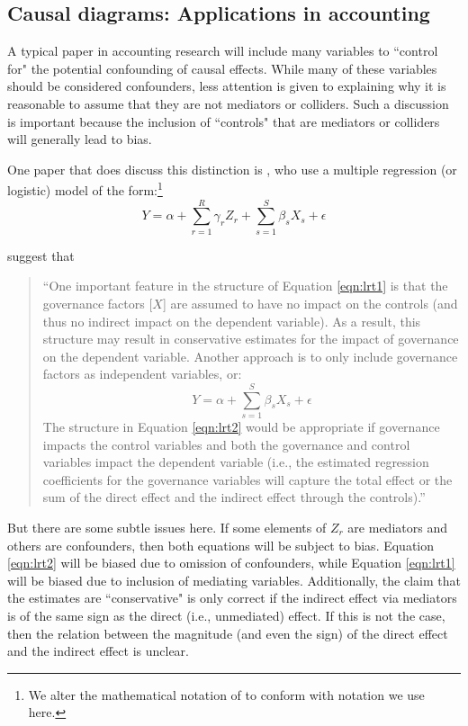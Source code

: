 \documentclass[12pt,reqno,titlepage]{amsart}
\theoremstyle{definition}
\begin{document}
\begin{doublespace}
\subsection{Causal diagrams: Applications in accounting}
A typical paper in accounting research will include many variables  to ``control for" the potential confounding of causal effects.
While many of these variables should be considered confounders, less attention is given to explaining why it is reasonable to assume that they are not mediators or colliders.
Such a discussion is important because the inclusion of ``controls" that are mediators or colliders will generally lead to bias.

One paper that does discuss this distinction is \citet{Larcker:2007aa}, who use a multiple regression (or logistic) model of the form:\footnote{We alter the mathematical notation of  \citet{Larcker:2007aa} to conform with notation we use here.}
\begin{equation}
Y = \alpha + \sum_{r=1}^R \gamma _r Z_r + \sum_{s=1}^S \beta_s X_s + \epsilon \label{eqn:lrt1}
\end{equation}

\noindent \citet{Larcker:2007aa} suggest that 

\begin{quote}\begin{singlespace} 
``One important feature in the structure of Equation \ref{eqn:lrt1} is that the governance factors [$X$] are assumed to have no impact on the controls (and thus no indirect impact on the dependent variable). 
As a result, this structure may result in conservative estimates for the impact of governance on the dependent variable. Another approach is to only include governance factors as independent variables, or:
\begin{equation}
Y = \alpha + \sum_{s =1}^S \beta_s X_s + \epsilon \label{eqn:lrt2}
\end{equation}
The structure in Equation \ref{eqn:lrt2} would be appropriate if governance impacts the control variables and both the governance and control variables impact the dependent variable (i.e., the estimated regression coefficients for the governance variables will capture the total effect or the sum of the direct effect and the indirect effect through the controls).''
\end{singlespace} \end{quote}

But there are some subtle issues here.
If some elements of $Z_r$ are mediators and others are confounders, then both equations will be subject to bias. 
Equation \ref{eqn:lrt2} will be biased due to omission of confounders, while Equation \ref{eqn:lrt1}  will be biased due to inclusion of mediating variables.
Additionally, the claim that the estimates are ``conservative" is only correct if the indirect effect via mediators is of the same sign as the direct (i.e., unmediated) effect. 
If this is not the case, then the relation between the magnitude (and even the sign) of the direct effect and the indirect effect is unclear.


\end{doublespace}
\end{document}
